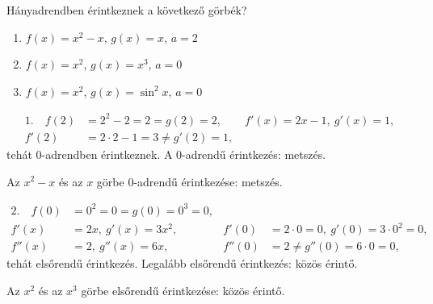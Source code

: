 \documentclass[11pt]{article}
\begin{document}
\begin{exbox}
\begin{example}
Hányadrendben érintkeznek a következő görbék?
\begin{enumerate}[label=\arabic*., itemsep=2pt]
\item $f(x)=x^{2}-x$, $g(x)=x$, $a=2$
\item $f(x)=x^{2}$, $g(x)=x^{3}$, $a=0$
\item $f(x)=x^{2}$, $g(x)=\sin^{2}x$, $a=0$
\end{enumerate}
\end{example}
\end{exbox}
\begin{solution}
\begin{align*}
1.\quad f(2)&=2^{2}-2=2=g(2)=2,\qquad f'(x)=2x-1,\ g'(x)=1,\\
f'(2)&=2\cdot 2-1=3\neq g'(2)=1,
\end{align*}
tehát $0$-adrendben érintkeznek. A $0$-adrendű érintkezés: metszés.

\begin{notefig}{Az $x^{2}-x$ és az $x$ görbe $0$-adrendű érintkezése: metszés.}
\end{notefig}

\begin{align*}
2.\quad f(0)&=0^{2}=0=g(0)=0^{3}=0,\\
f'(x)&=2x,\ g'(x)=3x^{2}, & f'(0)&=2\cdot 0=0,\ g'(0)=3\cdot 0^{2}=0,\\
f''(x)&=2,\ g''(x)=6x, & f''(0)&=2\neq g''(0)=6\cdot 0=0,
\end{align*}
tehát elsőrendű érintkezés. Legalább elsőrendű érintkezés: közös érintő.

\begin{notefig}{Az $x^{2}$ és az $x^{3}$ görbe elsőrendű érintkezése: közös érintő.}
\end{notefig}


\end{solution}
\end{document}
